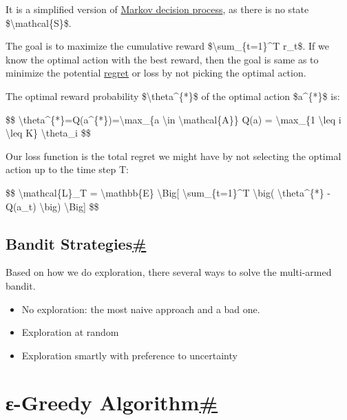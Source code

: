 It is a simplified version of \href{https://en.wikipedia.org/wiki/Markov_decision_process}{Markov decision process}, as there is no state \$\textbackslash mathcal\{S\}\$.

The goal is to maximize the cumulative reward \$\textbackslash sum\_\{t=1\}\^{}T r\_t\$. If we know the optimal action with the best reward, then the goal is same as to minimize the potential \href{https://en.wikipedia.org/wiki/Regret_(decision_theory)}{regret} or loss by not picking the optimal action.

The optimal reward probability \$\textbackslash theta\^{}\{*\}\$ of the optimal action \$a\^{}\{*\}\$ is:

\$\$ \textbackslash theta\^{}\{*\}=Q(a\^{}\{*\})=\textbackslash max\_\{a \textbackslash in \textbackslash mathcal\{A\}\} Q(a) = \textbackslash max\_\{1 \textbackslash leq i \textbackslash leq K\} \textbackslash theta\_i \$\$

Our loss function is the total regret we might have by not selecting the optimal action up to the time step T:

\$\$ \textbackslash mathcal\{L\}\_T = \textbackslash mathbb\{E\} \textbackslash Big{[} \textbackslash sum\_\{t=1\}\^{}T \textbackslash big( \textbackslash theta\^{}\{*\} - Q(a\_t) \textbackslash big) \textbackslash Big{]} \$\$

\subsection{\texorpdfstring{Bandit Strategies\hyperref[bandit-strategies]{\#}}{Bandit Strategies\#}}\label{bandit-strategies}

Based on how we do exploration, there several ways to solve the multi-armed bandit.

\begin{itemize}
\tightlist
\item
  No exploration: the most naive approach and a bad one.
\item
  Exploration at random
\item
  Exploration smartly with preference to uncertainty
\end{itemize}

\section{\texorpdfstring{ε-Greedy Algorithm\hyperref[ux3b5-greedy-algorithm]{\#}}{ε-Greedy Algorithm\#}}\label{ux3b5-greedy-algorithm}

